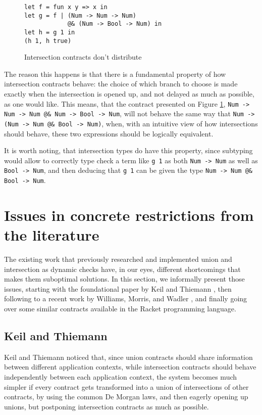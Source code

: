 \documentclass[sigplan,10pt,review,anonymous]{acmart}
\newcommand{\unsure}[2][1=]{}
\newcommand{\info}[2][1=]{}
\newcommand{\nickel}[1]{\lstinline[language=nickel]{#1}}
\begin{document}
\begin{figure}[h]
\begin{lstlisting}[language=nickel]
let f = fun x y => x in
let g = f | (Num -> Num -> Num)
            @& (Num -> Bool -> Num) in
let h = g 1 in
(h 1, h true)
\end{lstlisting}
\caption{Intersection contracts don't distribute}
\label{fig:intersection-distrbution}
\end{figure}

The reason this happens is that there is a fundamental property of how
intersection contracts behave: the choice of which branch to choose is made
exactly when the intersection is opened up, and not delayed as much as possible,
as one would like.  This means, that the contract presented on Figure
\ref{fig:intersection-distrbution}, \nickel{Num -> Num -> Num @& Num
-> Bool -> Num}, will not behave the same way that \nickel{Num ->
(Num -> Num @& Bool -> Num)}, when, with an intuitive view of how
intersections should behave, these two expressions should be logically
equivalent.

It is worth noting, that intersection types do have this property,
since subtyping would allow to correctly type check a term like
\nickel{g 1} as both \nickel{Num -> Num} as well as
\nickel{Bool -> Num}, and then deducing that \nickel{g 1}
can be given the type \nickel{Num -> Num @& Bool -> Num}.

\newpage

\section{Issues in concrete restrictions from the literature}
\label{sec:issues-literature}
\info{The various papers and the tradeoffs they make}

The existing work that previously researched and implemented
union and intersection
as dynamic checks have, in our eyes, different shortcomings
that makes them suboptimal solutions.
In this section, we informally present those issues,
starting with the foundational paper by Keil and Thiemann
\cite{KeilThiemannUnionIntersection}, then following to a recent
work by Williams, Morris, and Wadler \cite{RootCauseOfBlame}, and
finally going over some similar contracts available in the Racket
programming language.

\subsection*{Keil and Thiemann}
\label{sec:keil-thiemann}
\unsure{Subsection title?}
Keil and Thiemann noticed that, since union contracts should share information between
different application contexts, while intersection contracts should behave
independently between each application context, the system becomes much
simpler if every contract gets transformed into a union of intersections
of other contracts, by using the common De Morgan laws,
and then eagerly opening up unions, but postponing intersection
contracts as much as possible.
\end{document}
